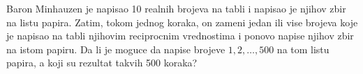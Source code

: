 \problem
Baron Minhauzen je napisao 10 realnih brojeva na tabli i napisao je njihov zbir na listu papira.
Zatim, tokom jednog koraka, on zameni jedan ili vise brojeva koje je napisao na tabli njihovim reciprocnim vrednostima i ponovo napise njihov zbir na istom papiru.
Da li je moguce da napise brojeve $1, 2, \ldots, 500$ na tom listu papira, a koji su rezultat takvih 500 koraka?
\solution
\endproblem
